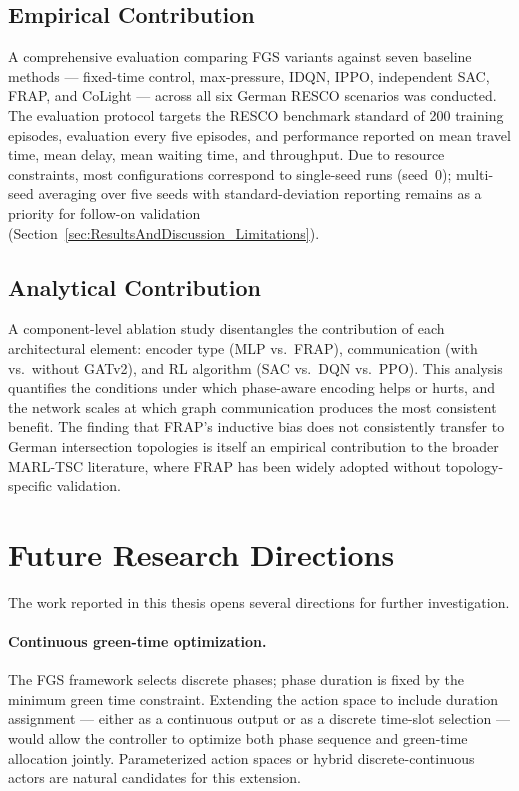 \subsection{Empirical Contribution}
\label{sec:ConclusionFutureWork_EmpiricalContribution}

A comprehensive evaluation comparing FGS variants against seven baseline methods — fixed-time control, max-pressure, IDQN, IPPO, independent SAC, FRAP, and CoLight — across all six German RESCO scenarios was conducted. The evaluation protocol targets the RESCO benchmark standard of 200 training episodes, evaluation every five episodes, and performance reported on mean travel time, mean delay, mean waiting time, and throughput. Due to resource constraints, most configurations correspond to single-seed runs (seed~0); multi-seed averaging over five seeds with standard-deviation reporting remains as a priority for follow-on validation (Section~\ref{sec:ResultsAndDiscussion_Limitations}).

\subsection{Analytical Contribution}
\label{sec:ConclusionFutureWork_AnalyticalContribution}

A component-level ablation study disentangles the contribution of each architectural element: encoder type (MLP vs.\ FRAP), communication (with vs.\ without GATv2), and RL algorithm (SAC vs.\ DQN vs.\ PPO). This analysis quantifies the conditions under which phase-aware encoding helps or hurts, and the network scales at which graph communication produces the most consistent benefit. The finding that FRAP's inductive bias does not consistently transfer to German intersection topologies is itself an empirical contribution to the broader MARL-TSC literature, where FRAP has been widely adopted without topology-specific validation.

\section{Future Research Directions}
\label{sec:ConclusionFutureWork_FutureResearch}

The work reported in this thesis opens several directions for further investigation.

\paragraph{Continuous green-time optimization.}
The FGS framework selects discrete phases; phase duration is fixed by the minimum green time constraint. Extending the action space to include duration assignment — either as a continuous output or as a discrete time-slot selection — would allow the controller to optimize both phase sequence and green-time allocation jointly. Parameterized action spaces or hybrid discrete-continuous actors are natural candidates for this extension.

